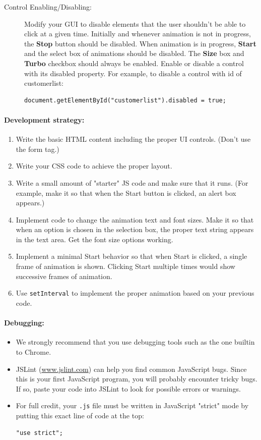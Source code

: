 \documentclass{article}
\newcommand{\myitem}{\paragraph}
\begin{document}
\begin{description}
\item[Control Enabling/Disabling:] Modify your GUI to disable
elements that the user shouldn't be able to click at a given time.
Initially and whenever animation is not in progress, the {\bf Stop} button
should be disabled.  When animation is in progress, {\bf Start} and the
select box of animations should be disabled.  The {\bf Size} box and
{\bf Turbo}
checkbox should always be enabled.  Enable or disable a control with
its disabled property.  For example, to disable a control with id of
customerlist:
\begin{Verbatim}[frame=single]
  document.getElementById("customerlist").disabled = true;
\end{Verbatim}

\end{description}

\myitem{Development strategy:}
\begin{enumerate}
  \item Write the basic HTML content
    including the proper UI controls.  (Don't use the form tag.)
  \item
    Write
    your CSS code to achieve the proper layout.
  \item
    Write a small amount
of "starter" JS code and make sure that it runs.  (For example, make
it so that when the Start button is clicked, an alert box appears.)
\item
  Implement code to change the animation text and font sizes.  Make
it so that when an option is chosen in the selection box, the proper
text string appears in the text area.  Get the font size options
working.
\item
  Implement a minimal Start behavior so that when Start is
clicked, a single frame of animation is shown. Clicking Start multiple
times would show successive frames of animation.

\item Use {\tt setInterval}
to implement the proper animation based on your previous code.
\end{enumerate}

\myitem{Debugging:}

\begin{itemize}
\item
We strongly recommend that you use debugging tools
such as the one builtin to Chrome.  
\item
JSLint (\url{www.jslint.com}) can
help you find common JavaScript bugs.  Since this is your first
JavaScript program, you will probably encounter tricky bugs.  If so,
paste your code into JSLint to look for possible errors or warnings.
\item
  For full credit, your {\tt .js} file must be written in JavaScript "strict"
mode by putting this exact line of code at the top:
\begin{Verbatim}[frame=single]
  "use strict";
  \end{Verbatim}
\end{itemize}
\end{document}
